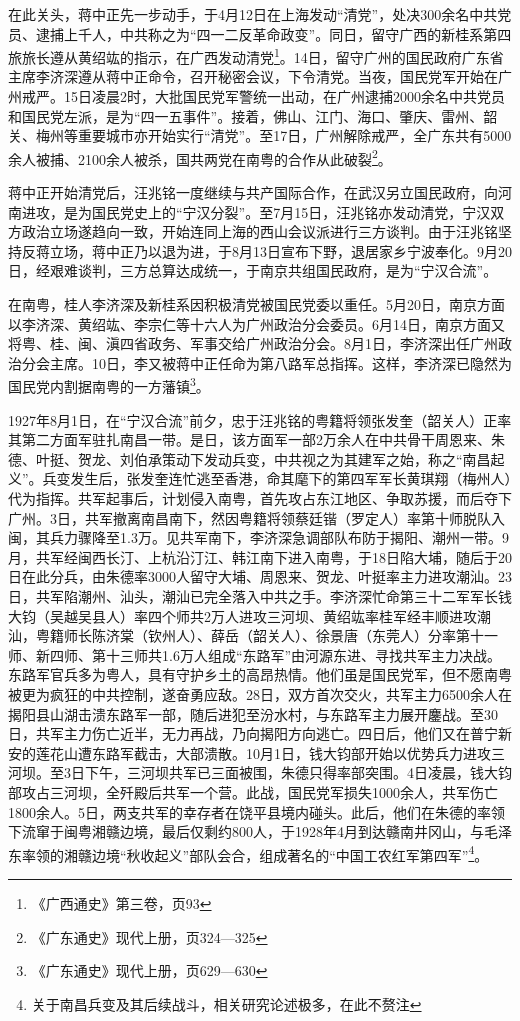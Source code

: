 在此关头，蒋中正先一步动手，于4月12日在上海发动“清党”，处决300余名中共党员、逮捕上千人，中共称之为“四一二反革命政变”。同日，留守广西的新桂系第四旅旅长遵从黄绍竑的指示，在广西发动清党\footnote{《广西通史》第三卷，页93}。14日，留守广州的国民政府广东省主席李济深遵从蒋中正命令，召开秘密会议，下令清党。当夜，国民党军开始在广州戒严。15日凌晨2时，大批国民党军警统一出动，在广州逮捕2000余名中共党员和国民党左派，是为“四一五事件”。接着，佛山、江门、海口、肇庆、雷州、韶关、梅州等重要城市亦开始实行“清党”。至17日，广州解除戒严，全广东共有5000余人被捕、2100余人被杀，国共两党在南粤的合作从此破裂\footnote{《广东通史》现代上册，页324—325}。

蒋中正开始清党后，汪兆铭一度继续与共产国际合作，在武汉另立国民政府，向河南进攻，是为国民党史上的“宁汉分裂”。至7月15日，汪兆铭亦发动清党，宁汉双方政治立场遂趋向一致，开始连同上海的西山会议派进行三方谈判。由于汪兆铭坚持反蒋立场，蒋中正乃以退为进，于8月13日宣布下野，退居家乡宁波奉化。9月20日，经艰难谈判，三方总算达成统一，于南京共组国民政府，是为“宁汉合流”。

在南粤，桂人李济深及新桂系因积极清党被国民党委以重任。5月20日，南京方面以李济深、黄绍竑、李宗仁等十六人为广州政治分会委员。6月14日，南京方面又将粤、桂、闽、滇四省政务、军事交给广州政治分会。8月1日，李济深出任广州政治分会主席。10日，李又被蒋中正任命为第八路军总指挥。这样，李济深已隐然为国民党内割据南粤的一方藩镇\footnote{《广东通史》现代上册，页629—630}。

1927年8月1日，在“宁汉合流”前夕，忠于汪兆铭的粤籍将领张发奎（韶关人）正率其第二方面军驻扎南昌一带。是日，该方面军一部2万余人在中共骨干周恩来、朱德、叶挺、贺龙、刘伯承策动下发动兵变，中共视之为其建军之始，称之“南昌起义”。兵变发生后，张发奎连忙逃至香港，命其麾下的第四军军长黄琪翔（梅州人）代为指挥。共军起事后，计划侵入南粤，首先攻占东江地区、争取苏援，而后夺下广州。3日，共军撤离南昌南下，然因粤籍将领蔡廷锴（罗定人）率第十师脱队入闽，其兵力骤降至1.3万。见共军南下，李济深急调部队布防于揭阳、潮州一带。9月，共军经闽西长汀、上杭沿汀江、韩江南下进入南粤，于18日陷大埔，随后于20日在此分兵，由朱德率3000人留守大埔、周恩来、贺龙、叶挺率主力进攻潮汕。23日，共军陷潮州、汕头，潮汕已完全落入中共之手。李济深忙命第三十二军军长钱大钧（吴越吴县人）率四个师共2万人进攻三河坝、黄绍竑率桂军经丰顺进攻潮汕，粤籍师长陈济棠（钦州人）、薛岳（韶关人）、徐景唐（东莞人）分率第十一师、新四师、第十三师共1.6万人组成“东路军”由河源东进、寻找共军主力决战。东路军官兵多为粤人，具有守护乡土的高昂热情。他们虽是国民党军，但不愿南粤被更为疯狂的中共控制，遂奋勇应敌。28日，双方首次交火，共军主力6500余人在揭阳县山湖击溃东路军一部，随后进犯至汾水村，与东路军主力展开鏖战。至30日，共军主力伤亡近半，无力再战，乃向揭阳方向逃亡。四日后，他们又在普宁新安的莲花山遭东路军截击，大部溃散。10月1日，钱大钧部开始以优势兵力进攻三河坝。至3日下午，三河坝共军已三面被围，朱德只得率部突围。4日凌晨，钱大钧部攻占三河坝，全歼殿后共军一个营。此战，国民党军损失1000余人，共军伤亡1800余人。5日，两支共军的幸存者在饶平县境内碰头。此后，他们在朱德的率领下流窜于闽粤湘赣边境，最后仅剩约800人，于1928年4月到达赣南井冈山，与毛泽东率领的湘赣边境“秋收起义”部队会合，组成著名的“中国工农红军第四军”\footnote{关于南昌兵变及其后续战斗，相关研究论述极多，在此不赘注}。

